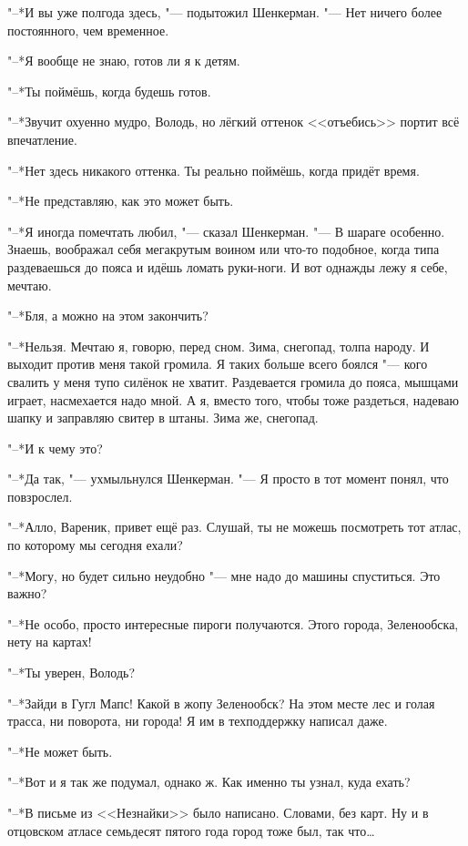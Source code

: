 "--*И вы уже полгода здесь, "--- подытожил Шенкерман.
"--- Нет ничего более постоянного, чем временное.

"--*Я вообще не знаю, готов ли я к детям.

"--*Ты поймёшь, когда будешь готов.

"--*Звучит охуенно мудро, Володь, но лёгкий оттенок <<отъебись>> портит всё впечатление.

"--*Нет здесь никакого оттенка.
Ты реально поймёшь, когда придёт время.

"--*Не представляю, как это может быть.

"--*Я иногда помечтать любил, "--- сказал Шенкерман.
"--- В шараге особенно.
Знаешь, воображал себя мегакрутым воином или что-то подобное, когда типа раздеваешься до пояса и идёшь ломать руки-ноги.
И вот однажды лежу я себе, мечтаю.

"--*Бля, а можно на этом закончить?

"--*Нельзя.
Мечтаю я, говорю, перед сном.
Зима, снегопад, толпа народу.
И выходит против меня такой громила.
Я таких больше всего боялся "--- кого свалить у меня тупо силёнок не хватит.
Раздевается громила до пояса, мышцами играет, насмехается надо мной.
А я, вместо того, чтобы тоже раздеться, надеваю шапку и заправляю свитер в штаны.
Зима же, снегопад.

"--*И к чему это?

"--*Да так, "--- ухмыльнулся Шенкерман.
"--- Я просто в тот момент понял, что повзрослел.

\asterism

"--*Алло, Вареник, привет ещё раз.
Слушай, ты не можешь посмотреть тот атлас, по которому мы сегодня ехали?

"--*Могу, но будет сильно неудобно "--- мне надо до машины спуститься.
Это важно?

"--*Не особо, просто интересные пироги получаются.
Этого города, Зеленообска, нету на картах!

"--*Ты уверен, Володь?

"--*Зайди в Гугл Мапс!
Какой в жопу Зеленообск?
На этом месте лес и голая трасса, ни поворота, ни города!
Я им в техподдержку написал даже.

"--*Не может быть.

"--*Вот и я так же подумал, однако ж.
Как именно ты узнал, куда ехать?

"--*В письме из <<Незнайки>> было написано.
Словами, без карт.
Ну и в отцовском атласе семьдесят пятого года город тоже был, так что\ldots{}

